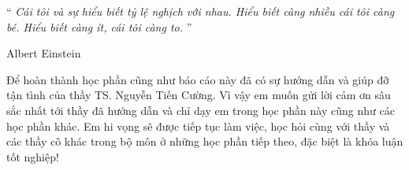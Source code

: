 \documentclass[
12pt,
oneside,
english,
doublespacing,
nolistspacing,
liststotoc,
parskip,
headsepline,
chapterinoneline,
]{MastersDoctoralThesis}
\begin{document}

\vspace*{0.2\textheight}

\noindent\enquote{\itshape 
	Cái tôi và sự hiểu biết tỷ lệ nghịch với nhau. Hiểu biết càng nhiều cái tôi càng bé. Hiểu biết càng ít, cái tôi càng to.
}\bigbreak

\hfill Albert Einstein



\begin{acknowledgements}
	\addchaptertocentry{\acknowledgementname}
	\thispagestyle{empty}
	Để hoàn thành học phần cũng như báo cáo này đã có sự hướng dẫn và giúp đỡ tận tình của thầy
	TS. Nguyễn Tiến Cường. Vì vậy em muốn gửi lời cảm ơn sâu sắc nhất tới thầy đã hướng dẫn và chỉ dạy
	em trong học phần này cũng như các học phần khác. Em hi vọng sẽ được tiếp tục làm việc, học hỏi cùng với thầy
	và các thầy cô khác trong bộ môn ở những học phần tiếp theo, đặc biệt là khóa luận tốt nghiệp!
\end{acknowledgements}


%

\begin{spacing}{1.15}
	\tableofcontents 	%
\end{spacing}

\begin{spacing}{1.15}
	\listoffigures 		%
\end{spacing}



\end{document}
